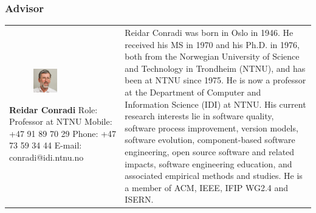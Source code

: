 \documentclass[11pt]{book}
\begin{document}
\subsubsection{Advisor}
\begin{table}[H]
\centering
\begin{tabular}{ p{7cm} p{7cm} }
\parbox{7cm}{
\begin{figure}[H]
      \includegraphics[width=0.4\textwidth]{Figures/reidar.jpg}
      \label{fig:partners_advisor_reidar}
\end{figure}
\textbf{Reidar Conradi}\\
Role: Professor at NTNU\\
Mobile: +47 91 89 70 29\\
Phone: +47 73 59 34 44\\
E-mail: conradi@idi.ntnu.no} & \parbox{7cm}{
Reidar Conradi was born in Oslo in 1946. He received his MS in 1970 and his Ph.D. in 1976, both from the Norwegian University of Science and Technology in Trondheim (NTNU), and has been at NTNU since 1975. He is now a professor at the Department of Computer and Information Science (IDI) at NTNU. His current research interests lie in software quality, software process improvement, version models, software evolution, component-based software engineering, open source software and related impacts, software engineering education, and associated empirical methods and studies. He is a member of ACM, IEEE, IFIP WG2.4 and ISERN.\cite{bioReidarConradi}
}
\end{tabular}
\label{tab:partners_advisor_reidar}
\end{table}
\end{document}

